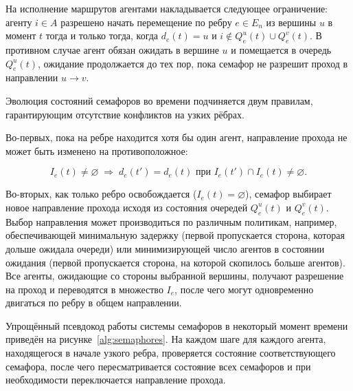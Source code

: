 На исполнение маршрутов агентами накладывается следующее ограничение: агенту $i \in A$ разрешено 
начать перемещение по ребру $e \in E_{n}$ из вершины $u$ в момент $t$ тогда и только тогда, 
когда $d_e(t) = u$ и $i \notin Q_e^{u}(t) \cup Q_e^{v}(t)$. В противном случае агент обязан ожидать 
в вершине $u$ и помещается в очередь $Q_e^{u}(t)$, ожидание продолжается до тех пор, пока семафор 
не разрешит проход в направлении $u \to v$.

Эволюция состояний семафоров во времени подчиняется двум правилам, гарантирующим отсутствие конфликтов 
на узких рёбрах.

Во-первых, пока на ребре находится хотя бы один агент, направление прохода не может 
быть изменено на противоположное:

\begin{equation}
    I_e(t) \neq \varnothing \;\Rightarrow\; d_e(t') = d_e(t)
    \text{ при } I_e(t') \cap I_e(t) \neq \varnothing.
\end{equation}

Во-вторых, как только ребро освобождается ($I_e(t) = \varnothing$), семафор выбирает новое направление 
прохода исходя из состояния очередей $Q_e^{u}(t)$ и $Q_e^{v}(t)$. Выбор направления может производиться по различным политикам, 
например, обеспечивающей минимальную задержку (первой пропускается сторона, которая дольше ожидала очереди)
или минимизирующей число агентов в состоянии ожидания (первой пропускается сторона, на которой скопилось больше агентов).
Все агенты, ожидающие со стороны выбранной вершины, получают разрешение на проход и переводятся в множество 
$I_e$, после чего могут одновременно двигаться по ребру в общем направлении.

Упрощённый псевдокод работы системы семафоров в некоторый момент времени приведён на
рисунке~\ref{alg:semaphores}. На каждом шаге для каждого агента, находящегося в начале узкого
ребра, проверяется состояние соответствующего семафора, после чего пересматривается состояние всех
семафоров и при необходимости переключается направление прохода.

